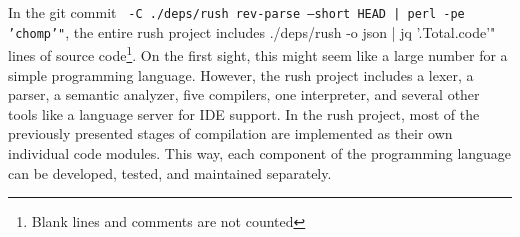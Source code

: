 \def\commit{}
In the git commit \ignorespaces\texttt{ -C ./deps/rush rev-parse --short HEAD | perl -pe 'chomp'"}\unskip, the entire rush project includes
 ./deps/rush -o json | jq '.Total.code'" lines of source code\footnote{Blank lines and comments are not counted}.
On the first sight, this might seem like a large number for a simple programming language.
However, the rush project includes a lexer, a parser, a semantic analyzer, five compilers, one interpreter, and several other tools like a language server for IDE support.
In the rush project, most of the previously presented stages of compilation are implemented as their own individual code modules.
This way, each component of the programming language can be developed, tested, and maintained separately.
